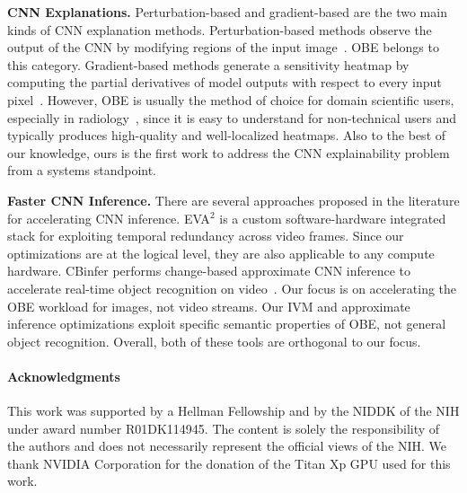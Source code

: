 \documentclass{vldb}
\begin{document}
\noindent \textbf{CNN Explanations.} Perturbation-based and gradient-based are the two main kinds of CNN explanation methods. Perturbation-based methods observe the output of the CNN by modifying regions of the input image~\cite{zeiler2014visualizing}. OBE belongs to this category.
Gradient-based methods generate a sensitivity heatmap by computing the partial derivatives of model outputs with respect to every input pixel~\cite{simonyan2013deep}.
However, OBE is usually the method of choice for domain scientific users, especially in radiology~\cite{jung2017deep,miller2017explanation}, since it is easy to understand for non-technical users and typically produces high-quality and well-localized heatmaps.
Also to the best of our knowledge, ours is the first work to address the CNN explainability problem from a systems standpoint.

\vspace{2mm}
\noindent \textbf{Faster CNN Inference.} There are several approaches proposed in the literature for accelerating CNN inference.
EVA$^2$ \cite{buckler2018eva} is a custom software-hardware integrated stack for exploiting temporal redundancy across video frames. Since our optimizations are at the logical level, they are also applicable to any compute hardware.
CBinfer performs change-based approximate CNN inference to accelerate real-time object recognition on video~\cite{cavigelli2017cbinfer}. Our focus is on accelerating the OBE workload for images, not video streams. Our IVM and approximate inference optimizations exploit specific semantic properties of OBE, not general object recognition. Overall, both of these tools are orthogonal to our focus.

\vspace{-2mm}
\paragraph*{Acknowledgments} This work was supported by a Hellman Fellowship and by the NIDDK of the NIH under award number R01DK114945. The content is solely the responsibility of the authors and does not necessarily represent the official views of the NIH. We thank NVIDIA Corporation for the donation of the Titan Xp GPU used for this work.


\vspace{-1mm}


\end{document}
